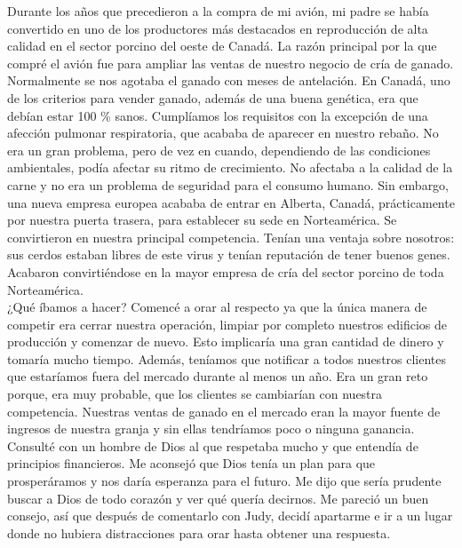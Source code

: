 \documentclass[twoside, 12pt]{book}
\begin{document}
Durante los años que precedieron a la compra de mi avión, mi padre se había convertido en uno de los productores más destacados en reproducción de alta calidad en el sector porcino del oeste de Canadá. La razón principal por la que compré el avión fue para ampliar las ventas de nuestro negocio de cría de ganado. Normalmente se nos agotaba el ganado con meses de antelación. En Canadá, uno de los criterios para vender ganado, además de una buena genética, era que debían estar 100 \% sanos. Cumplíamos los requisitos con la excepción de una afección pulmonar respiratoria, que acababa de aparecer en nuestro rebaño. No era un gran problema, pero de vez en cuando, dependiendo de las condiciones ambientales, podía afectar su ritmo de crecimiento. No afectaba a la calidad de la carne y no era un problema de seguridad para el consumo humano. Sin embargo, una nueva empresa europea acababa de entrar en Alberta, Canadá, prácticamente por nuestra puerta trasera, para establecer su sede en Norteamérica. Se convirtieron en nuestra principal competencia. Tenían una ventaja sobre nosotros: sus cerdos estaban libres de este virus y tenían reputación de tener buenos genes. Acabaron convirtiéndose en la mayor empresa de cría del sector porcino de toda Norteamérica.\\

¿Qué íbamos a hacer? Comencé a orar al respecto ya que la única manera de competir era cerrar nuestra operación, limpiar por completo nuestros edificios de producción y comenzar de nuevo. Esto implicaría una gran cantidad de dinero y tomaría mucho tiempo. Además, teníamos que notificar a todos nuestros clientes que estaríamos fuera del mercado durante al menos un año. Era un gran reto porque, era muy probable, que los clientes se cambiarían con nuestra competencia. Nuestras ventas de ganado en el mercado eran la mayor fuente de ingresos de nuestra granja y sin ellas tendríamos poco o ninguna ganancia. Consulté con un hombre de Dios al que respetaba mucho y que entendía de principios financieros. Me aconsejó que Dios tenía un plan para que prosperáramos y nos daría esperanza para el futuro. Me dijo que sería prudente buscar a Dios de todo corazón y ver qué quería decirnos. Me pareció un buen consejo, así que después de comentarlo con Judy, decidí apartarme e ir a un lugar donde no hubiera distracciones para orar hasta obtener una respuesta.\\
\end{document}
